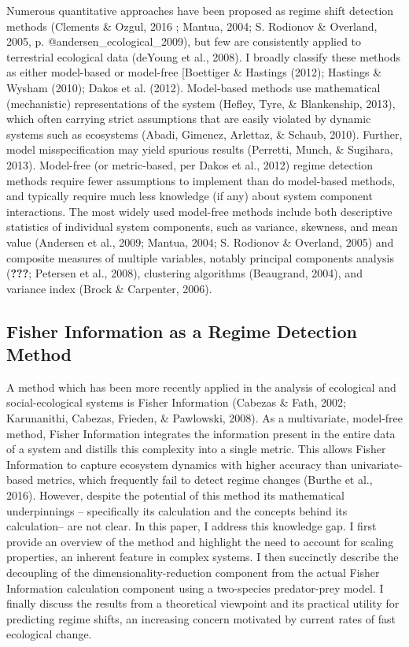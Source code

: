 \documentclass[12pt,twoside,openany]{reedthesis}
\begin{document}
Numerous quantitative approaches have been proposed as regime shift detection methods (Clements \& Ozgul, 2016 ; Mantua, 2004; S. Rodionov \& Overland, 2005, p. @andersen\_ecological\_2009), but few are consistently applied to terrestrial ecological data (deYoung et al., 2008). I broadly classify these methods as either model-based or model-free {[}Boettiger \& Hastings (2012); Hastings \& Wysham (2010); Dakos et al. (2012). Model-based methods use mathematical (mechanistic) representations of the system (Hefley, Tyre, \& Blankenship, 2013), which often carrying strict assumptions that are easily violated by dynamic systems such as ecosystems (Abadi, Gimenez, Arlettaz, \& Schaub, 2010). Further, model misspecification may yield spurious results (Perretti, Munch, \& Sugihara, 2013). Model-free (or metric-based, per Dakos et al., 2012) regime detection methods require fewer assumptions to implement than do model-based methods, and typically require much less knowledge (if any) about system component interactions. The most widely used model-free methods include both descriptive statistics of individual system components, such as variance, skewness, and mean value (Andersen et al., 2009; Mantua, 2004; S. Rodionov \& Overland, 2005) and composite measures of multiple variables, notably principal components analysis ({\textbf{???}}; Petersen et al., 2008), clustering algorithms (Beaugrand, 2004), and variance index (Brock \& Carpenter, 2006).

\hypertarget{fisher-information-as-a-regime-detection-method}{%
\subsection{Fisher Information as a Regime Detection Method}\label{fisher-information-as-a-regime-detection-method}}

A method which has been more recently applied in the analysis of ecological and social-ecological systems is Fisher Information (Cabezas \& Fath, 2002; Karunanithi, Cabezas, Frieden, \& Pawlowski, 2008). As a multivariate, model-free method, Fisher Information integrates the information present in the entire data of a system and distills this complexity into a single metric. This allows Fisher Information to capture ecosystem dynamics with higher accuracy than univariate-based metrics, which frequently fail to detect regime changes (Burthe et al., 2016). However, despite the potential of this method its mathematical underpinnings -- specifically its calculation and the concepts behind its calculation-- are not clear. In this paper, I address this knowledge gap. I first provide an overview of the method and highlight the need to account for scaling properties, an inherent feature in complex systems. I then succinctly describe the decoupling of the dimensionality-reduction component from the actual Fisher Information calculation component using a two-species predator-prey model. I finally discuss the results from a theoretical viewpoint and its practical utility for predicting regime shifts, an increasing concern motivated by current rates of fast ecological change.
\end{document}
